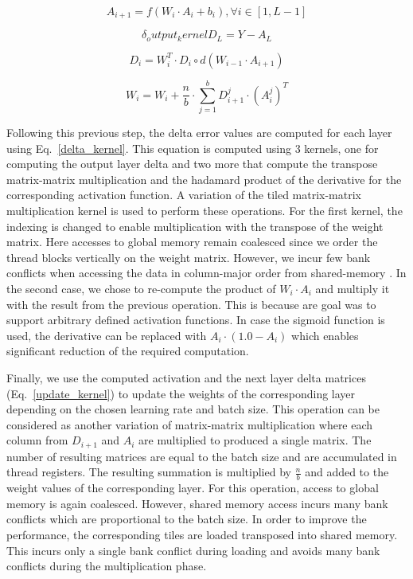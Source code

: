 \begin{equation}\label{act_kernel}
A_{i+1} = f\left(W_{i} \cdot A_{i} + b_i\right), \forall i \in \left[1,L-1\right]
\end{equation}

\begin{equation}\delta_output_kernel
D_{L} = Y - A_{L}
\end{equation}

\begin{equation}\label{delta_kernel}
D_{i} = W_{i}^T \cdot D_{i} \circ d(W_{i-1} \cdot A_{i+1})
\end{equation}

\begin{equation}\label{update_kernel}
W_{i} = W_{i} + \frac{n}{b} \cdot \sum_{j=1}^{b} D_{i+1}^{j} \cdot (A_{i}^j)^T
\end{equation}

Following this previous step, the delta error values are computed for each layer using Eq.~\ref{delta_kernel}. This equation is computed using 3 kernels, one for computing the output layer delta and two more that compute the transpose matrix-matrix multiplication and the hadamard product of the derivative for the corresponding activation function. A variation of the tiled matrix-matrix multiplication kernel is used to perform these operations. For the first kernel, the indexing is changed to enable multiplication with the transpose of the weight matrix. Here accesses to global memory remain coalesced since we order the thread blocks vertically on the weight matrix. However, we incur few bank conflicts when accessing the data in column-major order from shared-memory . In the second case, we chose to re-compute the product of $W_i \cdot A_i$ and multiply it with the result from the previous operation. This is because are goal was to support arbitrary defined activation functions. In case the sigmoid function is used, the derivative can be replaced with $A_i \cdot \left(1.0 - A_i\right)$ which enables significant reduction of the required computation.

Finally, we use the computed activation and the next layer delta matrices (Eq.~\ref{update_kernel}) to update the weights of the corresponding layer depending on the chosen learning rate and batch size. This operation can be considered as another variation of matrix-matrix multiplication where each column from $ D_{i+1}$ and $A_{i}$ are  multiplied to produced a single matrix. The number of resulting matrices are equal to the batch size and are accumulated in thread registers. The resulting summation is multiplied by $\frac{n}{b}$ and added to the weight values of the corresponding layer. For this operation, access to global memory is again coalesced. However, shared memory access incurs many bank conflicts which are proportional to the batch size. In order to improve the performance, the corresponding tiles are loaded transposed into shared memory. This incurs only a single bank conflict during loading and avoids many bank conflicts during the multiplication phase.